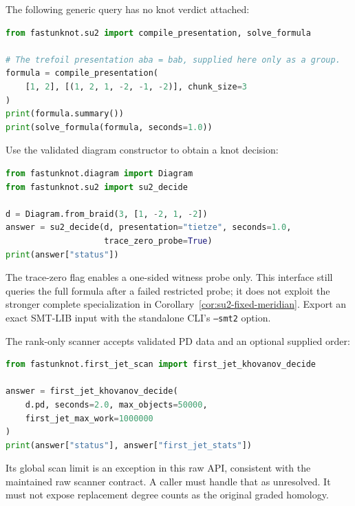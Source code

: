 The following generic query has no knot verdict attached:
\par\noindent\begin{minipage}{\linewidth}
\begin{lstlisting}[language=Python]
from fastunknot.su2 import compile_presentation, solve_formula

# The trefoil presentation aba = bab, supplied here only as a group.
formula = compile_presentation(
    [1, 2], [(1, 2, 1, -2, -1, -2)], chunk_size=3
)
print(formula.summary())
print(solve_formula(formula, seconds=1.0))
\end{lstlisting}
\end{minipage}\par
Use the validated diagram constructor to obtain a knot decision:
\par\noindent\begin{minipage}{\linewidth}
\begin{lstlisting}[language=Python]
from fastunknot.diagram import Diagram
from fastunknot.su2 import su2_decide

d = Diagram.from_braid(3, [1, -2, 1, -2])
answer = su2_decide(d, presentation="tietze", seconds=1.0,
                    trace_zero_probe=True)
print(answer["status"])
\end{lstlisting}
\end{minipage}\par
The trace-zero flag enables a one-sided witness probe only. This interface
still queries the full formula after a failed restricted probe; it does
not exploit the stronger complete specialization in
Corollary~\ref{cor:su2-fixed-meridian}. Export an
exact SMT-LIB input with the standalone CLI's \texttt{--smt2} option.

The rank-only scanner accepts validated PD data and an optional supplied
order:
\par\noindent\begin{minipage}{\linewidth}
\begin{lstlisting}[language=Python]
from fastunknot.first_jet_scan import first_jet_khovanov_decide

answer = first_jet_khovanov_decide(
    d.pd, seconds=2.0, max_objects=50000,
    first_jet_max_work=1000000
)
print(answer["status"], answer["first_jet_stats"])
\end{lstlisting}
\end{minipage}\par
Its global scan limit is an exception in this raw API, consistent with
the maintained raw scanner contract. A caller must handle that as
unresolved. It must not expose replacement degree counts as the original
graded homology.

